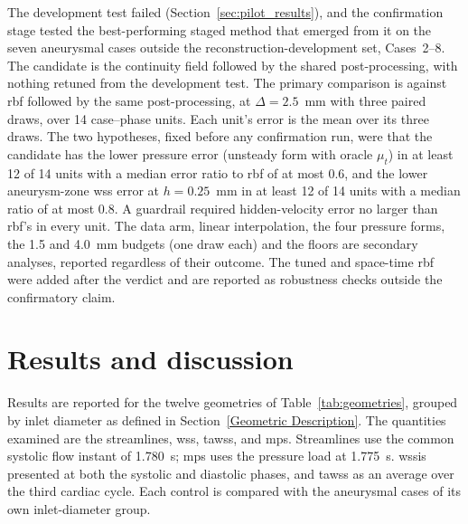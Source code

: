 \documentclass[12pt,a4paper]{article}
\newcommand{\cfdrevision}[1]{#1} %
\newcommand{\WSS}{\ac{wss}\xspace}
\newcommand{\TAWSS}{\ac{tawss}\xspace}
\newcommand{\MPS}{\ac{mps}\xspace}
\newcommand{\RBF}{\ac{rbf}\xspace}
\theoremstyle{definition}
\numberwithin{equation}{section}
\providecommand{\DIFaddtex}[1]{{\protect\color{blue} \sf #1}} %
\providecommand{\DIFdeltex}[1]{{\protect\color{red} \scriptsize #1}} %
\providecommand{\DIFaddbegin}{} %
\providecommand{\DIFaddend}{} %
\providecommand{\DIFdelbegin}{} %
\providecommand{\DIFdelend}{} %
\providecommand{\DIFadd}[1]{\texorpdfstring{\DIFaddtex{#1}}{#1}} %
\providecommand{\DIFdel}[1]{\texorpdfstring{\DIFdeltex{#1}}{}} %
\newcommand{\DIFscaledelfig}{0.5}
\newlength{\DIFdelgraphicswidth} %
\newlength{\DIFdelgraphicsheight} %
\newcommand{\DIFaddincludegraphics}[2][]{{\color{blue}\fbox{\DIFOincludegraphics[#1]{#2}}}} %
\newcommand{\DIFdelincludegraphics}[2][]{%
\sbox{\DIFdelgraphicsbox}{\DIFOincludegraphics[#1]{#2}}%
\settoboxwidth{\DIFdelgraphicswidth}{\DIFdelgraphicsbox} %
\settoboxtotalheight{\DIFdelgraphicsheight}{\DIFdelgraphicsbox} %
\scalebox{\DIFscaledelfig}{%
\parbox[b]{\DIFdelgraphicswidth}{\usebox{\DIFdelgraphicsbox}\\[-\baselineskip] \rule{\DIFdelgraphicswidth}{0em}}\llap{\resizebox{\DIFdelgraphicswidth}{\DIFdelgraphicsheight}{%
\setlength{\unitlength}{\DIFdelgraphicswidth}%
\begin{picture}(1,1)%
\thicklines\linethickness{2pt} %
{\color[rgb]{1,0,0}\put(0,0){\framebox(1,1){}}}%
{\color[rgb]{1,0,0}\put(0,0){\line( 1,1){1}}}%
{\color[rgb]{1,0,0}\put(0,1){\line(1,-1){1}}}%
\end{picture}%
}\hspace*{3pt}}} %
} %
\DeclareRobustCommand{\DIFaddbegin}{\DIFOaddbegin \let\includegraphics\DIFaddincludegraphics} %
\DeclareRobustCommand{\DIFaddend}{\DIFOaddend \let\includegraphics\DIFOincludegraphics} %
\DeclareRobustCommand{\DIFdelbegin}{\DIFOdelbegin \let\includegraphics\DIFdelincludegraphics} %
\DeclareRobustCommand{\DIFdelend}{\DIFOaddend \let\includegraphics\DIFOincludegraphics} %
\renewcommand{\DIFaddtex}[1]{{\protect\color{red}#1}}
\renewcommand{\DIFdeltex}[1]{}
\renewcommand{\DIFdel}[1]{}
\renewcommand{\DIFaddincludegraphics}[2][]{\DIFOincludegraphics[#1]{#2}}
\renewcommand{\DIFdelincludegraphics}[2][]{}
\renewcommand{\cfdrevision}[1]{\textcolor{red}{#1}}
\def\DIFaddbegin{}\def\DIFaddend{}%
\def\DIFdelbegin{}\def\DIFdelend{}%
\def\cfdrevision#1{#1}%
\begin{document}
The development test failed (Section~\ref{sec:pilot_results}), and the confirmation stage tested the best-performing staged method that emerged from it on the seven aneurysmal cases \DIFdelbegin \DIFdel{not used to fit, select or tune any reconstruction method, }\DIFdelend \DIFaddbegin \DIFadd{outside the reconstruction-development set, }\DIFaddend Cases~2--8. The candidate is the continuity field followed by the shared post-processing, with nothing retuned from the development test. The primary comparison is against \RBF followed by the same post-processing, at $\Delta=2.5$~mm with three paired draws, over 14 case--phase units. Each unit's error is the mean over its three draws. The two hypotheses, fixed before any confirmation run, were that the candidate has the lower pressure error (unsteady form with oracle $\mu_t$) in at least 12 of 14 units with a median error ratio to \RBF of at most 0.6, and the lower aneurysm-zone \WSS error at $h=0.25$~mm in at least 12 of 14 units with a median ratio of at most 0.8. A guardrail required hidden-velocity error no larger than \RBF's in every unit. The data arm, linear interpolation, the four pressure forms, the 1.5 and 4.0~mm budgets (one draw each) and the floors are secondary analyses, reported regardless of their outcome. The tuned and space-time \RBF were added after the verdict and are reported as robustness checks outside the confirmatory claim.

\section{\label{Results and Discussions}Results and discussion}
\label{sec:cfd_results}
Results are reported for the twelve geometries of Table~\ref{tab:geometries},
grouped by inlet diameter as defined in Section~\ref{Geometric Description}. The
quantities examined are the streamlines, \WSS, \TAWSS, and \MPS. \DIFdelbegin \DIFdel{Streamlines and
}%
\DIFdel{are presented at peak systole as the peak-loading condition, }\DIFdelend \DIFaddbegin \DIFadd{\cfdrevision{Streamlines use the common systolic flow instant of 1.780~s; \MPS uses the pressure load at 1.775~s.} }\DIFaddend \WSS \DIFdelbegin \DIFdel{at }\DIFdelend \DIFaddbegin \DIFadd{is presented at }\DIFaddend both
the systolic and diastolic phases, and \TAWSS as an average over the third
cardiac cycle. Each control is compared with the aneurysmal cases of its own
inlet-diameter group.
\end{document}

